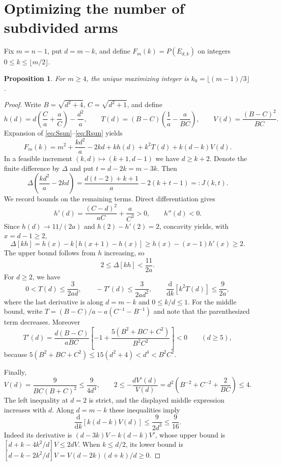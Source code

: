 \documentclass[11pt,a4paper]{article}
\numberwithin{equation}{section}
\newtheorem{proposition}[theorem]{Proposition}
\newcommand{\dd}{\mathrm{d}}
\begin{document}
\section{Optimizing the number of subdivided arms}
Fix $m=n-1$, put $d=m-k$, and define $F_m(k)=P(E_{d,k})$ on integers $0\le k\le\lfloor m/2\rfloor$.
\begin{proposition}\label{prop:arms}
For $m\ge4$, the unique maximizing integer is $k_0=\lfloor(m-1)/3\rfloor$.
\end{proposition}
\begin{proof}
Write $B=\sqrt{d^2+4}$, $C=\sqrt{d^2+1}$, and define
\[
h(d)=d\left(\frac{C}{a}+\frac aC\right)-\frac{d^2}a,\qquad
T(d)=(B-C)\left(\frac1a-\frac a{BC}\right),\qquad
V(d)=\frac{(B-C)^2}{BC}.
\]
Expansion of \eqref{eq:Ssun}--\eqref{eq:Rsun} yields
\begin{equation}\label{eq:Fexpand}
F_m(k)=m^2+\frac{kd^2}{a}-2kd+kh(d)+k^2T(d)+k(d-k)V(d).
\end{equation}
In a feasible increment $(k,d)\mapsto(k+1,d-1)$ we have $d\ge k+2$. Denote the finite difference by $\Delta$ and put $t=d-2k=m-3k$. Then
\begin{equation}\label{eq:J}
\Delta\left(\frac{kd^2}a-2kd\right)
=\frac{d(t-2)+k+1}{a}-2(k+t-1)=:J(k,t).
\end{equation}
We record bounds on the remaining terms. Direct differentiation gives
\[h'(d)=\frac{(C-d)^2}{aC}+\frac a{C^3}>0,\qquad h''(d)<0.\]
Since $h(d)\to11/(2a)$ and $h(2)-h'(2)=2$, concavity yields, with $x=d-1\ge2$,
\[
\Delta[kh]=h(x)-k[h(x+1)-h(x)]\ge h(x)-(x-1)h'(x)\ge2.
\]
The upper bound follows from $h$ increasing, so
\begin{equation}\label{eq:h-increment}
2\le\Delta[kh]<\frac{11}{2a}.
\end{equation}
For $d\ge2$, we have
\begin{equation}\label{eq:T-bounds}
0<T(d)\le\frac3{2ad},\qquad -T'(d)\le\frac3{2ad^2},\qquad
\frac{\dd}{\dd k}[k^2T(d)]\le\frac9{2a},
\end{equation}
where the last derivative is along $d=m-k$ and $0\le k/d\le1$. For the middle bound, write
$T=(B-C)/a-a(C^{-1}-B^{-1})$ and note that the parenthesized term decreases. Moreover
\[
T'(d)=\frac{d(B-C)}{aBC}\left[-1+\frac{5(B^2+BC+C^2)}{B^2C^2}\right]<0\qquad(d\ge5),
\]
because $5(B^2+BC+C^2)\le15(d^2+4)<d^4<B^2C^2$.

Finally,
\begin{equation}\label{eq:V-bounds}
V(d)=\frac9{BC(B+C)^2}\le\frac9{4d^4},\qquad
2\le-\frac{dV'(d)}{V(d)}=d^2\left(B^{-2}+C^{-2}+\frac2{BC}\right)\le4.
\end{equation}
The left inequality at $d=2$ is strict, and the displayed middle expression increases with $d$. Along $d=m-k$ these inequalities imply
\begin{equation}\label{eq:V-increment}
\frac{\dd}{\dd k}[k(d-k)V(d)]\le\frac9{2d^3}\le\frac9{16}.
\end{equation}
Indeed its derivative is $(d-3k)V-k(d-k)V'$, whose upper bound is $[d+k-4k^2/d]V\le2dV$. When $k\le d/2$, its lower bound is
$[d-k-2k^2/d]V=V(d-2k)(d+k)/d\ge0$.


\end{proof}
\end{document}
